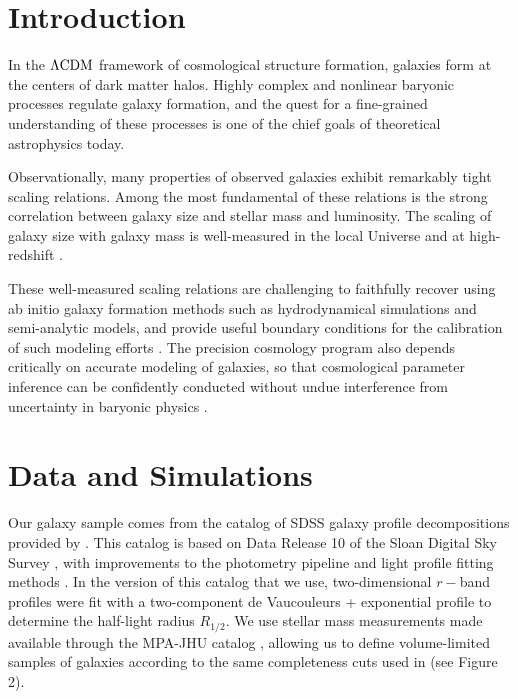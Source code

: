 \documentclass[usenatbib,usegraphicx,letterpaper]{mn2e}
\newcommand{\rhalf}{R_{1/2}}
\newcommand{\lcdm}{\Lambda{\rm CDM}}
\begin{document}
\section{Introduction}
\label{sec:intro}

In the $\lcdm$ framework of cosmological structure formation, galaxies form at the centers of dark matter halos. Highly complex and nonlinear baryonic processes regulate galaxy formation, and the quest for a fine-grained understanding of these processes is one of the chief goals of theoretical astrophysics today. 

Observationally, many properties of observed galaxies exhibit remarkably tight scaling relations. Among the most fundamental of these relations is the strong correlation between galaxy size and stellar mass and luminosity. The scaling of galaxy size with galaxy mass is well-measured in the local Universe \citep{shen_etal03,guo_etal09,huang_etal13,zhang_yang17} and at high-redshift \citep{trujillo_etal04,vanderwel_etal14,kawamata_etal15,shibuya_etal15,huertas_company_etal13a,lange_etal15,huang_etal17}.

These well-measured scaling relations are challenging to faithfully recover using ab initio galaxy formation methods such as hydrodynamical simulations and semi-analytic models, and provide useful boundary conditions for the calibration of such modeling efforts \citep{khochfar_silk06,dutton_etal10,hopkins_etal10a,bottrell_etal17b}. The precision cosmology program also depends critically on accurate modeling of galaxies, so that cosmological parameter inference can be confidently conducted without undue interference from uncertainty in baryonic physics \citep{LSST_science,LSST_galaxies}. 



\section{Data and Simulations}
\label{sec:data}

Our galaxy sample comes from the catalog of SDSS galaxy profile decompositions provided by \citet{meert_etal15}. This catalog is based on Data Release 10 of the Sloan Digital Sky Survey \citep[SDSS,][]{ahn_etal14}, with improvements to the photometry pipeline and light profile fitting methods \citep{vikram_etal10,bernardi_etal13,bernardi_etal14,meert_etal13}. In the version of this catalog that we use, two-dimensional $r-$band profiles were fit with a two-component de Vaucouleurs + exponential profile to determine the half-light radius $\rhalf.$ We use stellar mass measurements made available through the MPA-JHU catalog \citep{kauffmann_etal03,brinchmann_etal04}, allowing us to define volume-limited samples of galaxies according to the same completeness cuts used in \citet{behroozi_etal15} (see Figure 2). 
\end{document}
